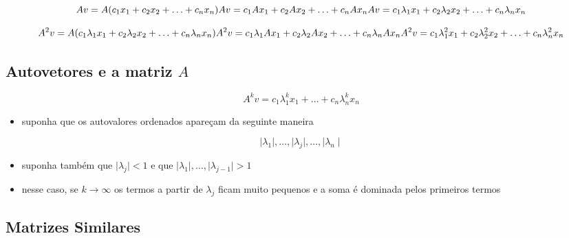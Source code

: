 \documentclass[
  letterpaper,
  DIV=11,
  numbers=noendperiod]{scrartcl}
\providecommand{\tightlist}{%
  \setlength{\itemsep}{0pt}\setlength{\parskip}{0pt}}\usepackage{longtable,booktabs,array}
\begin{document}
\begin{tcolorbox}[enhanced jigsaw, arc=.35mm, opacityback=0, bottomtitle=1mm, left=2mm, coltitle=black, rightrule=.15mm, colbacktitle=quarto-callout-note-color!10!white, breakable, opacitybacktitle=0.6, bottomrule=.15mm, title=\textcolor{quarto-callout-note-color}{\faInfo}\hspace{0.5em}{Note}, titlerule=0mm, colframe=quarto-callout-note-color-frame, toprule=.15mm, toptitle=1mm, leftrule=.75mm, colback=white]
\[ Av = A(c_1x_1 + c_2x_2 + \ldots + c_nx_n)\\ Av = c_1Ax_1 + c_2Ax_2 + \ldots + c_nAx_n\\ Av = c_1\lambda_1x_1 + c_2\lambda_2x_2 + \ldots + c_n\lambda_nx_n\]

\[ A^2v = A(c_1\lambda_1x_1 + c_2\lambda_2x_2 + \ldots + c_n\lambda_nx_n)\\ A^2v = c_1\lambda_1Ax_1 + c_2\lambda_2Ax_2 + \ldots + c_n\lambda_nAx_n\\ A^2v = c_1\lambda_1^2x_1 + c_2\lambda_2^2x_2 + \ldots + c_n\lambda_n^2x_n\]
\end{tcolorbox}

\hypertarget{autovetores-e-a-matriz-a-1}{%
\subsection{\texorpdfstring{Autovetores e a matriz
\(A\)}{Autovetores e a matriz A}}\label{autovetores-e-a-matriz-a-1}}

\[ A^kv = c_1\lambda_1^kx_1 + \ldots + c_n\lambda_n^kx_n\]

\begin{itemize}
\tightlist
\item
  suponha que os autovalores ordenados apareçam da seguinte maneira
\end{itemize}

\[ \mid \lambda_1 \mid, \ldots, \mid \lambda_j\mid, \ldots, \mid \lambda_n\mid\]

\begin{itemize}
\tightlist
\item
  suponha também que \(\mid \lambda_j \mid < 1\) e que
  \(\mid \lambda_1 \mid, \ldots, \mid\lambda_{j-1}\mid >1\)
\item
  nesse caso, se \(k \rightarrow \infty\) os termos a partir de
  \(\lambda_j\) ficam muito pequenos e a soma é dominada pelos primeiros
  termos
\end{itemize}

\hypertarget{matrizes-similares}{%
\subsection{Matrizes Similares}\label{matrizes-similares}}
\end{document}
